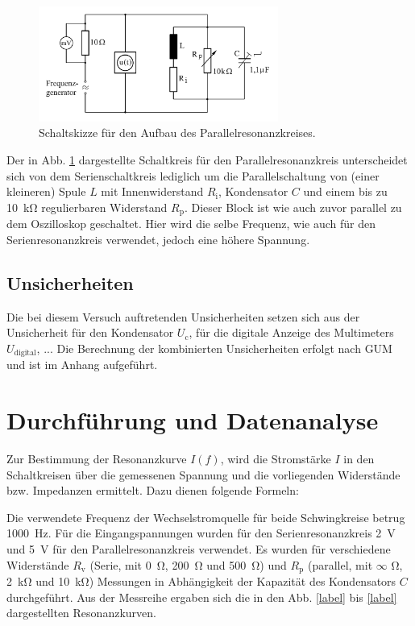 			\begin{figure}[ht]
				\centering
				\includegraphics[width=0.7\textwidth]{auswertung/Parallelresonanz.PNG}
				\caption{Schaltskizze für den Aufbau des Parallelresonanzkreises.}
				\label{fig:ParallelResonanzSkizze}	
			\end{figure}
			
			Der in Abb. \ref{fig:ParallelResonanzSkizze} dargestellte Schaltkreis für den Parallelresonanzkreis unterscheidet sich von dem Serienschaltkreis lediglich um die Parallelschaltung von (einer kleineren) Spule $L$ mit Innenwiderstand $R_\text{i}$, Kondensator $C$ und einem bis zu \SI{10}{\kilo\ohm} regulierbaren Widerstand $R_\text{p}$. 
			Dieser Block ist wie auch zuvor parallel zu dem Oszilloskop geschaltet.
			Hier wird die selbe Frequenz, wie auch für den Serienresonanzkreis verwendet, jedoch eine höhere Spannung.

	\subsection{Unsicherheiten} 

		Die bei diesem Versuch auftretenden Unsicherheiten setzen sich aus der Unsicherheit für den Kondensator $U_\text{c}$, für die digitale Anzeige des Multimeters $U_\text{digital}$, ... %
		Die Berechnung der kombinierten Unsicherheiten erfolgt nach GUM und ist im Anhang aufgeführt.

\section{Durchführung und Datenanalyse}

	Zur Bestimmung der Resonanzkurve $I(f)$, wird die Stromstärke $I$ in den Schaltkreisen über die gemessenen Spannung und die vorliegenden Widerstände bzw. Impedanzen ermittelt.
	Dazu dienen folgende Formeln:
	
	
	Die verwendete Frequenz der Wechselstromquelle für beide Schwingkreise betrug \SI{1000}{\hertz}.
	Für die Eingangspannungen wurden für den Serienresonanzkreis \SI{2}{\volt} und \SI{5}{\volt} für den Parallelresonanzkreis verwendet.
	Es wurden für verschiedene Widerstände $R_\text{v}$ (Serie, mit \SI{0}{\ohm}, \SI{200}{\ohm} und \SI{500}{\ohm}) und $R_\text{p}$ (parallel, mit $\infty$ \si{\ohm}, \SI{2}{\kilo\ohm} und \SI{10}{\kilo\ohm}) Messungen in Abhängigkeit der Kapazität des Kondensators $C$ durchgeführt.
	Aus der Messreihe ergaben sich die in den Abb. \ref{label} bis \ref{label} dargestellten Resonanzkurven. %
	
